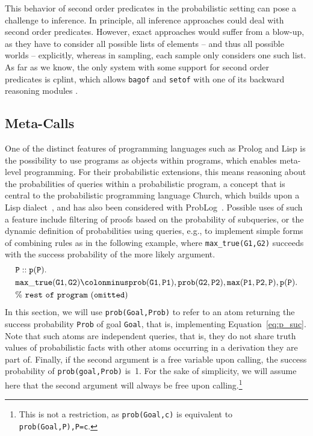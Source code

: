 \documentclass[a4paper]{article}
\begin{document}
This behavior of second order predicates in the probabilistic setting
can pose a challenge to inference. 
In principle, all inference approaches could 
deal with second order predicates. 
However, exact
approaches would 
suffer from a blow-up, as they have to consider all possible lists of
elements -- and thus all possible worlds -- explicitly, whereas in sampling, each sample only considers
one such list. As far as we know, the only system with some support
for second order predicates is cplint, which allows \verb|bagof| and \verb|setof|
with one of its backward reasoning modules \citep{cplintmanual}. 


\subsection{Meta-Calls}
\label{sec:metacalls}
One of the distinct features of programming languages such as Prolog
and Lisp is the possibility to use programs as objects within
programs, which enables meta-level programming. For their
probabilistic extensions, this means reasoning about the probabilities
of queries within a probabilistic program, a concept that is central
to the probabilistic programming language Church, which builds upon a
Lisp dialect~\citep{Goodman08}, and has also been considered with
ProbLog~\citep{Mantadelis11}.  
Possible uses of such a feature include filtering of proofs based on
the probability of subqueries, or the dynamic definition of
probabilities using queries, e.g., to implement simple forms of
combining rules as in the following example, where \verb|max_true(G1,G2)| succeeds with the
success probability of the more likely argument. 
\begin{align*}
&\mathtt{P}::\mathtt{p(P).}\\
&\mathtt{max\_true(G1,G2)} \colonminus
\mathtt{prob(G1,P1),prob(G2,P2),max(P1,P2,P),p(P)}.\\
&\mathtt{\% ~rest~ of~ program ~(omitted)}
\end{align*}
In this section, we will use \verb|prob(Goal,Prob)| to refer to an atom returning the success probability \verb|Prob| of goal \verb|Goal|, that is, implementing Equation~\eqref{eq:p_suc}. Note that such atoms are independent queries, that is, they do not share truth values of probabilistic facts with other atoms occurring in a derivation they are part of. Finally, if the second argument is a free variable upon calling, the success probability of \verb|prob(goal,Prob)| is~1. For the sake of simplicity, we will assume here that the second argument will always be free upon calling.\footnote{This is not a restriction, as \texttt{prob(Goal,c)} is equivalent to \texttt{prob(Goal,P),P=c}.}
\end{document}
